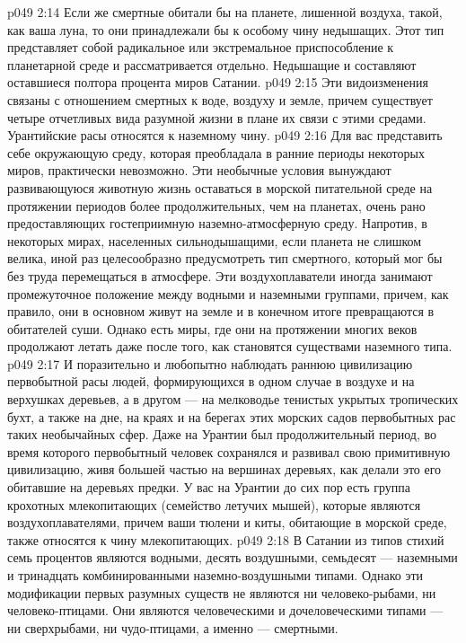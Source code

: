 \vs p049 2:14 Если же смертные обитали бы на планете, лишенной воздуха, такой, как ваша луна, то они принадлежали бы к особому чину недышащих. Этот тип представляет собой радикальное или экстремальное приспособление к планетарной среде и рассматривается отдельно. Недышащие и составляют оставшиеся полтора процента миров Сатании.
\vs p049 2:15 \bibnobreakspace {} Эти видоизменения связаны с отношением смертных к воде, воздуху и земле, причем существует четыре отчетливых вида разумной жизни в плане их связи с этими средами. Урантийские расы относятся к наземному чину.
\vs p049 2:16 Для вас представить себе окружающую среду, которая преобладала в ранние периоды некоторых миров, практически невозможно. Эти необычные условия вынуждают развивающуюся животную жизнь оставаться в морской питательной среде на протяжении периодов более продолжительных, чем на планетах, очень рано предоставляющих гостеприимную наземно\hyp{}атмосферную среду. Напротив, в некоторых мирах, населенных сильнодышащими, если планета не слишком велика, иной раз целесообразно предусмотреть тип смертного, который мог бы без труда перемещаться в атмосфере. Эти воздухоплаватели иногда занимают промежуточное положение между водными и наземными группами, причем, как правило, они в основном живут на земле и в конечном итоге превращаются в обитателей суши. Однако есть миры, где они на протяжении многих веков продолжают летать даже после того, как становятся существами наземного типа.
\vs p049 2:17 И поразительно и любопытно наблюдать раннюю цивилизацию первобытной расы людей, формирующихся в одном случае в воздухе и на верхушках деревьев, а в другом --- на мелководье тенистых укрытых тропических бухт, а также на дне, на краях и на берегах этих морских садов первобытных рас таких необычайных сфер. Даже на Урантии был продолжительный период, во время которого первобытный человек сохранялся и развивал свою примитивную цивилизацию, живя большей частью на вершинах деревьях, как делали это его обитавшие на деревьях предки. У вас на Урантии до сих пор есть группа крохотных млекопитающих (семейство летучих мышей), которые являются воздухоплавателями, причем ваши тюлени и киты, обитающие в морской среде, также относятся к чину млекопитающих.
\vs p049 2:18 В Сатании из типов стихий семь процентов являются водными, десять воздушными, семьдесят --- наземными и тринадцать комбинированными наземно\hyp{}воздушными типами. Однако эти модификации первых разумных существ не являются ни человеко\hyp{}рыбами, ни человеко\hyp{}птицами. Они являются человеческими и дочеловеческими типами --- ни сверхрыбами, ни чудо\hyp{}птицами, а именно --- смертными.
